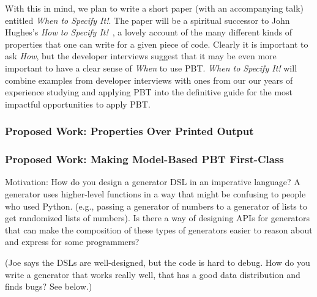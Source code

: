With this in mind, we plan to write a short paper (with an accompanying talk)
entitled {\em When to Specify It!}. The paper will be a spiritual successor to
John Hughes's {\em How to Specify It!}~\cite{HowToSpecifyIt}, a lovely account
of the many different kinds of properties that one can write for a given piece
of code. Clearly it is important to ask {\em How}, but the developer interviews
suggest that it may be even more important to have a clear sense of {\em When}
to use PBT. {\em When to Specify It!} will combine examples from developer
interviews with ones from our our years of experience studying and applying PBT
into the definitive guide for the most impactful opportunities to apply PBT.

\subsubsection{Proposed Work: Properties Over Printed Output}
\subsubsection{Proposed Work: Making Model-Based PBT First-Class}

Motivation: How do you design a generator DSL in an imperative language? A
generator uses higher-level functions in a way that might be confusing to people
who used Python.  (e.g., passing a generator of numbers to a generator of lists
to get randomized lists of numbers). Is there a way of designing APIs for
generators that can make the composition of these types of generators easier to
reason about and express for some programmers?

(Joe says the DSLs are well-designed, but the code is hard to debug. How do you
write a generator that works really well, that has a good data distribution and
finds bugs? See below.)

